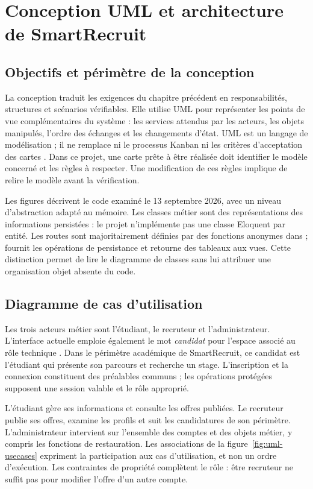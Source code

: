\chapter{Conception UML et architecture de SmartRecruit}
\label{chap:conception}

\section{Objectifs et périmètre de la conception}
La conception traduit les exigences du chapitre précédent en responsabilités, structures et scénarios vérifiables. Elle utilise UML pour représenter les points de vue complémentaires du système : les services attendus par les acteurs, les objets manipulés, l'ordre des échanges et les changements d'état. UML est un langage de modélisation ; il ne remplace ni le processus Kanban ni les critères d'acceptation des cartes \cite{omg-uml}. Dans ce projet, une carte prête à être réalisée doit identifier le modèle concerné et les règles à respecter. Une modification de ces règles implique de relire le modèle avant la vérification.

Les figures décrivent le code examiné le 13 septembre 2026, avec un niveau d'abstraction adapté au mémoire. Les classes métier sont des représentations des informations persistées : le projet n'implémente pas une classe Eloquent par entité. Les routes sont majoritairement définies par des fonctions anonymes dans  ;  fournit les opérations de persistance et retourne des tableaux aux vues. Cette distinction permet de lire le diagramme de classes sans lui attribuer une organisation objet absente du code.

\section{Diagramme de cas d'utilisation}
Les trois acteurs métier sont l'étudiant, le recruteur et l'administrateur. L'interface actuelle emploie également le mot \emph{candidat} pour l'espace associé au rôle technique . Dans le périmètre académique de SmartRecruit, ce candidat est l'étudiant qui présente son parcours et recherche un stage. L'inscription et la connexion constituent des préalables communs ; les opérations protégées supposent une session valable et le rôle approprié.

L'étudiant gère ses informations et consulte les offres publiées. Le recruteur publie ses offres, examine les profils et suit les candidatures de son périmètre. L'administrateur intervient sur l'ensemble des comptes et des objets métier, y compris les fonctions de restauration. Les associations de la figure~\ref{fig:uml-usecases} expriment la participation aux cas d'utilisation, et non un ordre d'exécution. Les contraintes de propriété complètent le rôle : être recruteur ne suffit pas pour modifier l'offre d'un autre compte.

